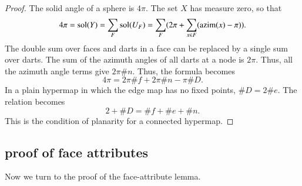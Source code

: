 \begin{proof}  The solid angle of a sphere is $4\pi$.  The set $X$
has measure zero, so that
$$
4\pi = \operatorname{sol}(Y)= \sum_F \operatorname{sol}(U_F) = 
\sum_F ( 2\pi + \sum_{x\in F} ({\operatorname{azim}}(x)-\pi) ).
$$
The double sum over faces and darts in a face can be replaced by
a single sum over darts.  
The sum of the azimuth angles of all darts at a node is $2\pi$. Thus,
all the azimuth angle terms give $2\pi\#n$.
Thus, the formula becomes
$$
4\pi = 2\pi \#f +2\pi\#n - \pi \#D.
$$
In a plain hypermap in which the edge map has no fixed points, $\#D = 2\#e$.
The relation becomes
$$
2 + \#D = \#f + \#e + \#n.
$$
This is the condition of planarity for a connected hypermap.
\end{proof}

\subsection{proof of face attributes}

Now we turn to the proof of the face-attribute lemma.

